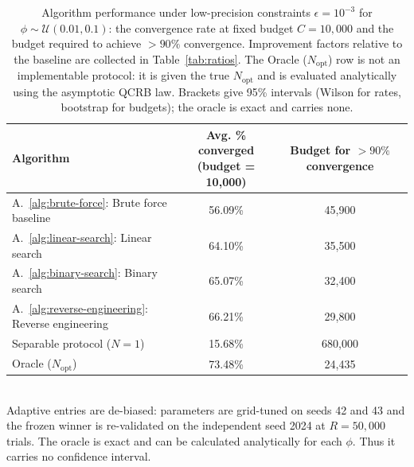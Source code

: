 \begin{table}[ht]
\centering
\caption{Algorithm performance under low-precision constraints $\epsilon=10^{-3}$ for $\phi\sim\mathcal{U}(0.01,0.1)$: the convergence rate at fixed budget $C=10{,}000$ and the budget required to achieve \(>90\%\) convergence. Improvement factors relative to the baseline are collected in Table~\ref{tab:ratios}. The Oracle ($N_\text{opt}$) row is not an implementable protocol: it is given the true $N_\text{opt}$ and is evaluated analytically using the asymptotic QCRB law. Brackets give 95\% intervals (Wilson for rates, bootstrap for budgets); the oracle is exact and carries none.}
\label{tab:summary-low-prec-ci}
\begin{tabular}{lcc}
\toprule
Algorithm
& \makecell{Avg. \% converged \\ (budget = 10{,}000)}
& \makecell{Budget for $>90\%$ \\ convergence} \\
\midrule
A.~\ref{alg:brute-force}: Brute force baseline
& 56.09\% \newline {\scriptsize [55.66, 56.53]}
& 45{,}900 \newline {\scriptsize [45{,}300, 46{,}500]} \\
A.~\ref{alg:linear-search}: Linear search
& 64.10\% \newline {\scriptsize [63.68, 64.52]}
& 35{,}500 \newline {\scriptsize [34{,}900, 36{,}000]} \\
A.~\ref{alg:binary-search}: Binary search
& 65.07\% \newline {\scriptsize [64.65, 65.49]}
& 32{,}400 \newline {\scriptsize [32{,}000, 32{,}900]} \\
A.~\ref{alg:reverse-engineering}: Reverse engineering
& 66.21\% \newline {\scriptsize [65.79, 66.62]}
& 29{,}800 \newline {\scriptsize [29{,}200, 30{,}300]} \\
\midrule
Separable protocol ($N=1$)
& 15.68\% \newline {\scriptsize [15.36, 16.00]}
& 680{,}000 \newline {\scriptsize [669{,}000, 691{,}000]} \\
\midrule
Oracle ($N_\text{opt}$)
& 73.48\%
& 24{,}435 \\
\bottomrule
\end{tabular}
\\[2pt]
\footnotesize Adaptive entries are de-biased: parameters are grid-tuned on seeds 42 and 43 and the frozen winner is re-validated on the independent seed 2024 at $R=50{,}000$ trials. The oracle is exact and can be calculated analytically for each $\phi$. Thus it carries no confidence interval.
\end{table}
